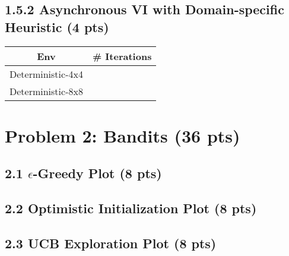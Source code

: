 \documentclass[12pt]{article}
\begin{document}
\subsection*{1.5.2 Asynchronous VI with Domain-specific Heuristic (4 pts)}
\begin{solution}[height=5cm]
\begin{center}
  \begin{tabular}{|c|c|}\hline
    {\bf Env} & {\bf \# Iterations} \\ \hline
    Deterministic-4x4 & \\ \hline
    Deterministic-8x8 & \\ \hline
  \end{tabular}
\end{center}

\end{solution}


\newpage
\section*{Problem 2: Bandits (36 pts)}
\subsection*{2.1 $\epsilon$-Greedy Plot (8 pts)}
\begin{tcolorbox}[fit,height=22em, width=40em, blank, borderline={1pt}{1pt},nobeforeafter]
    \begin{center}
    \end{center}
    \end{tcolorbox}

\subsection*{2.2 Optimistic Initialization Plot (8 pts)}
\begin{tcolorbox}[fit,height=22em, width=40em, blank, borderline={1pt}{1pt},nobeforeafter]
            \begin{center}
            \end{center}
            \end{tcolorbox}

\subsection*{2.3 UCB Exploration Plot (8 pts)}
\begin{tcolorbox}[fit,height=22em, width=40em, blank, borderline={1pt}{1pt},nobeforeafter]
    \begin{center}
    \end{center}
    \end{tcolorbox}
    
\end{document}
